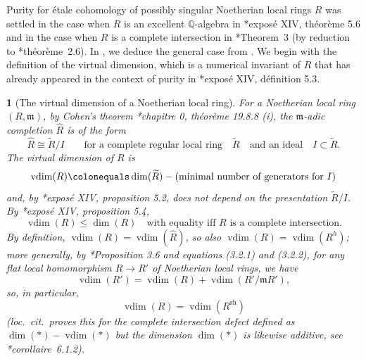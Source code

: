 \documentclass[11pt, reqno]{amsart}
\newcommand{\bQ}{\mathbb{Q}}
\newcommand{\fm}{\mathfrak{m}}
\DeclareMathOperator{\vdim}{vdim}		%
\newcommand{\ce}{\colonequals}
\newcommand{\ra}{\rightarrow}
\newcommand{\sh}{\mathrm{sh}}		%
\newcommand{\wh}{\widehat}
\newcommand{\wt}{\widetilde}
\newcommand{\lab}{\label}
\newcommand{\q}{\quad}
\newcommand{\qq}{\quad\quad}
\newcommand{\be}{\begin{equation}}
\newcommand{\ee}{\end{equation}}
\numberwithin{equation}{numberingbase}
\theoremstyle{thms}
\theoremstyle{claims}
\theoremstyle{defs}
\theoremstyle{thms}
\theoremstyle{defs}
\theoremstyle{subsection-tweak}
\newtheorem{pp}[numberingbase]{}
\newcommand{\bpp}{\begin{pp}}
\newcommand{\epp}{\end{pp}}
\theoremstyle{subsection-tweak}
\begin{document}
Purity for \'{e}tale cohomology of possibly singular Noetherian local rings $R$ was settled in the case when $R$ is an excellent $\bQ$-algebra in \cite{SGA2new}*{expos\'{e} XIV, th\'{e}or\`{e}me 5.6} and in the case when $R$ is a complete intersection in \cite{Gab04}*{Theorem~3} (by reduction to \cite{Ill03}*{th\'{e}or\`{e}me~2.6}). In , we deduce the general case from . We begin with the definition of the virtual dimension, which is a numerical invariant of $R$ that has already appeared in the context of purity in \cite{SGA2new}*{expos\'{e} XIV, d\'{e}finition 5.3}.









\bpp[The virtual dimension of a Noetherian local ring] \lab{geom-depth-def}
For a Noetherian local ring $(R, \fm)$, by Cohen's theorem \cite{EGAIV1}*{chapitre 0, th\'{e}or\`{e}me 19.8.8 (i)}, the $\fm$-adic completion $\wh{R}$ is of the form
\[%
\wh{R} \cong \wt{R}/I \qq \text{for a complete regular local ring} \q \wt{R} \q \text{and an ideal} \q I \subset \wt{R}.
\]%
The \emph{virtual dimension} of $R$ is %
\be \label{eqn:vdim-def}
\vdim(R) \ce \dim(\wt{R}) - (\text{minimal number of generators for $I$})
\ee
and, by \cite{SGA2new}*{expos\'{e} XIV, proposition 5.2}, does not depend on the presentation $\wt{R}/I$. %
By \cite{SGA2new}*{expos\'{e} XIV, proposition 5.4}, %
\be \label{vdim-ineq}
\vdim(R) \le \dim(R) \q \text{with equality iff $R$ is a complete intersection.}
\ee
By definition, $\vdim(R) = \vdim(\wh{R})$, so also $\vdim(R) = \vdim(R^h)$; %
more generally, by \cite{Avr77}*{Proposition 3.6 and equations (3.2.1) and (3.2.2)}, for any flat local homomorphism $R \ra R'$ of Noetherian local rings, we have
\be \label{vdim-add}
\vdim(R') = \vdim(R) + \vdim(R'/\fm R'), 
\ee
so, in particular,
\[
\vdim(R) = \vdim(R^{\sh})
\]
(\emph{loc.~cit.}~proves this for the \emph{complete intersection defect} defined as $\dim(*) - \vdim(*)$ but the dimension $\dim(*)$ is likewise additive, see \cite{EGAIV2}*{corollaire~6.1.2}). %
\epp
\end{document}
